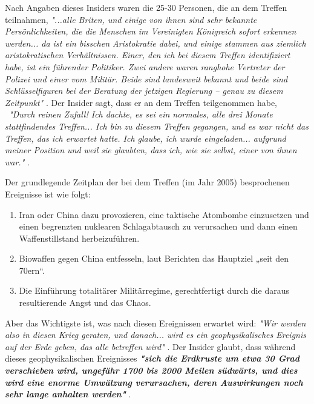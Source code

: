 \documentclass[10pt,twocolumn,letterpaper]{article}
\begin{document}
Nach Angaben dieses Insiders waren die 25-30 Personen, die an dem Treffen teilnahmen, \textit{"...alle Briten, und einige von ihnen sind sehr bekannte Persönlichkeiten, die die Menschen im Vereinigten Königreich sofort erkennen werden... da ist ein bisschen Aristokratie dabei, und einige stammen aus ziemlich aristokratischen Verhältnissen. Einer, den ich bei diesem Treffen identifiziert habe, ist ein führender Politiker. Zwei andere waren ranghohe Vertreter der Polizei und einer vom Militär. Beide sind landesweit bekannt und beide sind Schlüsselfiguren bei der Beratung der jetzigen Regierung – genau zu diesem Zeitpunkt"} \cite{4}. Der Insider sagt, dass er an dem Treffen teilgenommen habe, \ \textit{"Durch reinen Zufall! Ich dachte, es sei ein normales, alle drei Monate stattfindendes Treffen... Ich bin zu diesem Treffen gegangen, und es war nicht das Treffen, das ich erwartet hatte. Ich glaube, ich wurde eingeladen... aufgrund meiner Position und weil sie glaubten, dass ich, wie sie selbst, einer von ihnen war."} \cite{4}.

Der grundlegende Zeitplan der bei dem Treffen (im Jahr 2005) besprochenen Ereignisse ist wie folgt:
\begin{flushleft}
\begin{enumerate}
    \item Iran oder China dazu provozieren, eine taktische Atombombe einzusetzen und einen begrenzten nuklearen Schlagabtausch zu verursachen und dann einen Waffenstillstand herbeizuführen.
    \item Biowaffen gegen China entfesseln, laut Berichten das Hauptziel „seit den 70ern“.
    \item Die Einführung totalitärer Militärregime, gerechtfertigt durch die daraus resultierende Angst und das Chaos.
\end{enumerate}
\end{flushleft}

Aber das Wichtigste ist, was nach diesen Ereignissen erwartet wird: \textit{"Wir werden also in diesen Krieg geraten, und danach... wird es ein geophysikalisches Ereignis auf der Erde geben, das alle betreffen wird"} \cite{4}. Der Insider glaubt, dass während dieses geophysikalischen Ereignisses \textit{\textbf{"sich die Erdkruste um etwa 30 Grad verschieben wird, ungefähr 1700 bis 2000 Meilen südwärts, und dies wird eine enorme Umwälzung verursachen, deren Auswirkungen noch sehr lange anhalten werden"}} \cite{4}.
\end{document}
